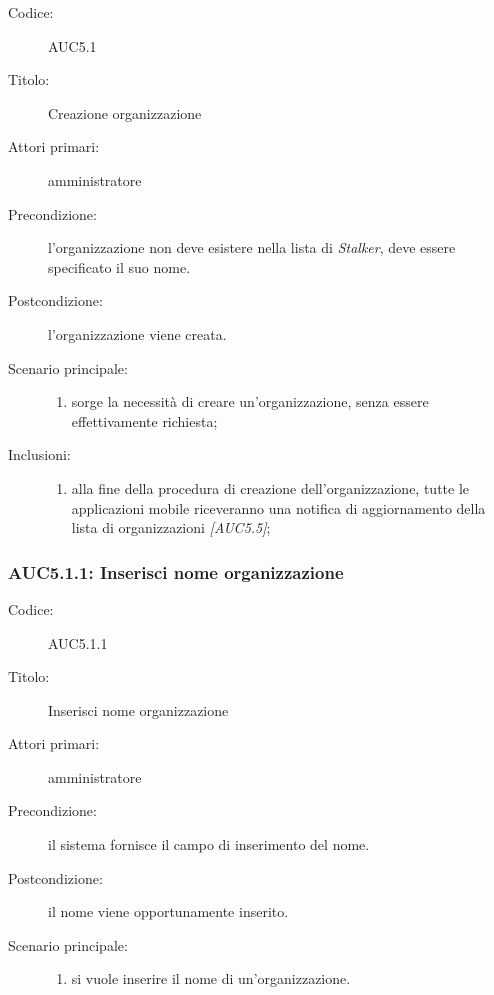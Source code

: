 \documentclass[../../../analisi-dei-requisiti.tex]{subfiles}
\begin{document}
  \begin{description}
    \item[Codice:] AUC5.1
    \item[Titolo:] Creazione organizzazione
    \item[Attori primari:] amministratore
    \item[Precondizione:] l'organizzazione non deve esistere nella lista di \emph{Stalker}, deve essere specificato il suo nome.
    \item[Postcondizione:] l'organizzazione viene creata.
    \item[Scenario principale:]
    \begin{enumerate}
      \item sorge la necessità di creare un'organizzazione, senza essere effettivamente richiesta;
    \end{enumerate}
    \item[Inclusioni:]
    \begin{enumerate}
      \item alla fine della procedura di creazione dell'organizzazione, tutte le applicazioni mobile riceveranno una notifica di aggiornamento della lista di organizzazioni \emph{[AUC5.5]};
    \end{enumerate}
  \end{description}

\subsubsection{AUC5.1.1: Inserisci nome organizzazione}%
  \label{subs:AUC5.1.1}
  \begin{description}
    \item[Codice:] AUC5.1.1
    \item[Titolo:] Inserisci nome organizzazione
    \item[Attori primari:] amministratore
    \item[Precondizione:] il sistema fornisce il campo di inserimento del nome.
    \item[Postcondizione:] il nome viene opportunamente inserito.
    \item[Scenario principale:]
    \begin{enumerate}
      \item si vuole inserire il nome di un'organizzazione.
    \end{enumerate}

  \end{description}
\end{document}
